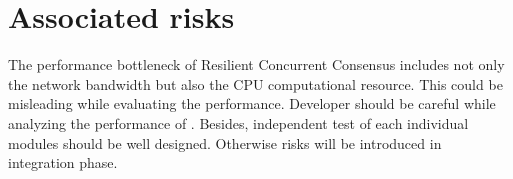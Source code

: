 \section{Associated risks}
The performance bottleneck of Resilient Concurrent Consensus includes not only the 
network bandwidth but also the CPU computational resource. 
This could be misleading while evaluating the performance. 
Developer should be careful while analyzing the performance of \RCC{}.
Besides, independent test of each individual modules should be 
well designed. Otherwise risks will be introduced in integration phase.
